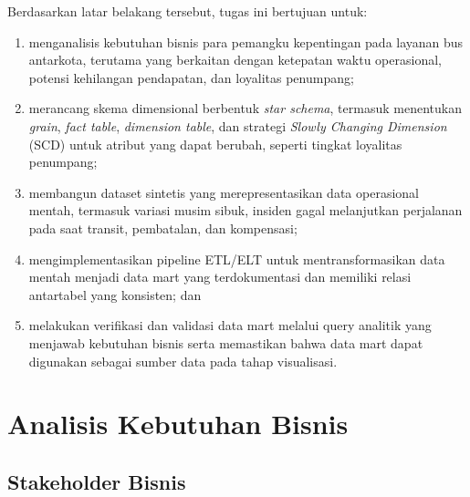 Berdasarkan latar belakang tersebut, tugas ini bertujuan untuk:
\begin{enumerate}[label=\alph*., leftmargin=*, topsep=0pt, itemsep=0pt,
    parsep=0pt, partopsep=0pt, before=\vspace{-\parskip}]
    \item menganalisis kebutuhan bisnis para pemangku kepentingan pada layanan bus
    antarkota, terutama yang berkaitan dengan ketepatan waktu operasional, potensi
    kehilangan pendapatan, dan loyalitas penumpang;
    \item merancang skema dimensional berbentuk \textit{star schema}, termasuk
    menentukan \textit{grain}, \textit{fact table}, \textit{dimension table}, dan
    strategi \textit{Slowly Changing Dimension} (SCD) untuk atribut yang dapat
    berubah, seperti tingkat loyalitas penumpang;
    \item membangun dataset sintetis yang merepresentasikan data operasional mentah,
    termasuk variasi musim sibuk, insiden gagal melanjutkan perjalanan pada saat
    transit, pembatalan, dan kompensasi;
    \item mengimplementasikan pipeline ETL/ELT untuk mentransformasikan data mentah
    menjadi data mart yang terdokumentasi dan memiliki relasi antartabel yang
    konsisten; dan
    \item melakukan verifikasi dan validasi data mart melalui query analitik yang
    menjawab kebutuhan bisnis serta memastikan bahwa data mart dapat digunakan
    sebagai sumber data pada tahap visualisasi.
\end{enumerate}

\section{Analisis Kebutuhan Bisnis}
\subsection{Stakeholder Bisnis}

